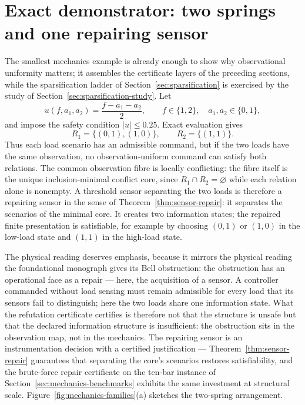 \documentclass[11pt]{article}
\theoremstyle{plain}
\theoremstyle{definition}
\theoremstyle{remark}
\begin{document}
\section{Exact demonstrator: two springs and one repairing sensor}
\label{sec:two-spring}

The smallest mechanics example is already enough to show why observational
uniformity matters; it assembles the certificate layers of the preceding
sections, while the sparsification ladder of Section~\ref{sec:sparsification}
is exercised by the study of Section~\ref{sec:sparsification-study}.  Let
\[
  u(f,a_1,a_2)=\frac{f-a_1-a_2}{2},\qquad
  f\in\{1,2\},\quad a_1,a_2\in\{0,1\},
\]
and impose the safety condition \(|u|\le 0.25\).  Exact evaluation gives
\[
  R_1=\{(0,1),(1,0)\},
  \qquad
  R_2=\{(1,1)\}.
\]
Thus each load scenario has an admissible command, but if the two loads have the
same observation, no observation-uniform command can satisfy both relations.
The common observation fibre is locally conflicting: the fibre itself is the
unique inclusion-minimal conflict core, since \(R_1\cap R_2=\varnothing\)
while each relation alone is nonempty.  A threshold sensor separating the two
loads is therefore a repairing sensor in the sense of
Theorem~\ref{thm:sensor-repair}: it separates the scenarios of the minimal
core.  It creates two information states; the repaired finite
presentation is satisfiable, for example by choosing \((0,1)\) or \((1,0)\) in
the low-load state and \((1,1)\) in the high-load state.

The physical reading deserves emphasis, because it mirrors the physical
reading the foundational monograph gives its Bell obstruction: the
obstruction has an operational face as a repair --- here, the acquisition
of a sensor.  A controller commanded without load sensing must remain
admissible for every load that its sensors fail to distinguish; here the
two loads share one information state.  What the refutation certificate certifies is
therefore not that the structure is unsafe but that the declared
information structure is insufficient: the obstruction sits in the
observation map, not in the mechanics.  The repairing sensor is an
instrumentation decision with a certified justification ---
Theorem~\ref{thm:sensor-repair} guarantees that separating the core's
scenarios restores satisfiability, and the brute-force repair certificate
on the ten-bar instance of Section~\ref{sec:mechanics-benchmarks} exhibits
the same investment at structural scale.
Figure~\ref{fig:mechanics-families}(a) sketches the two-spring arrangement.
\end{document}
